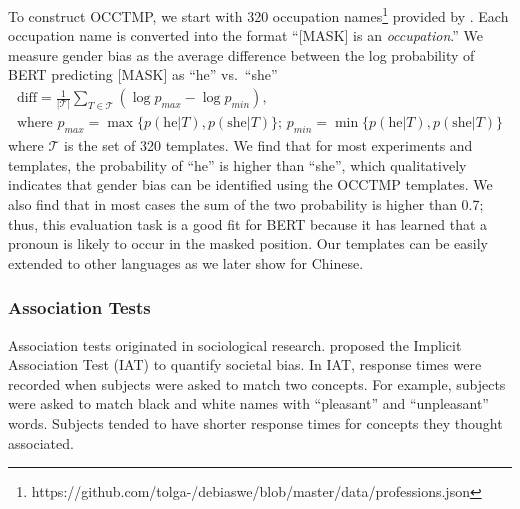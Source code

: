 To construct OCCTMP, we start with 320 occupation names\footnote{https://github.com/tolga-/debiaswe/blob/master/data/professions.json} provided by . Each occupation name is converted into the format ``[MASK] is an \textit{occupation}.''
We measure gender bias as the average difference between the log probability of BERT predicting [MASK] as ``he'' vs.\ ``she''
\begin{gather*}
\text{diff}=\frac{1}{|{\mathcal T}|} \sum_{T \in
	{\mathcal T}}(\log p_{max} - \log p_{min}),\\
\mbox{where }p_{max}=\max\{p(\mbox{he}| T),p(\mbox{she}| T)\} \mbox{; }p_{min}=\min\{p(\mbox{he}| T),p(\mbox{she}| T)\}
\end{gather*}
where $\mathcal T$ is the set of 320 templates.  We find
that for most experiments and templates, the probability of
``he'' is higher than ``she'', which qualitatively indicates
that gender bias can be identified using the OCCTMP templates. We also find that in most cases the sum of the two probability is higher than 0.7; thus, this evaluation task is a good fit for BERT because it has learned that a pronoun is likely to occur in the masked position. Our templates can be easily extended to other languages as we later show for Chinese.

\subsubsection{Association Tests}\label{sec:weat}
Association tests originated in sociological research.  proposed the Implicit Association Test (IAT) to quantify societal bias. In IAT, response times were recorded when subjects were asked to match two concepts. For example, subjects were asked to match black and white names with “pleasant” and “unpleasant” words. Subjects tended to have shorter response times for concepts they thought associated. 

